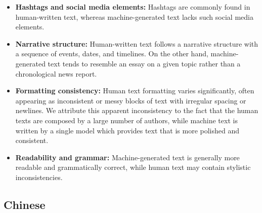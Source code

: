 \begin{itemize}
    \item \textbf{Hashtags and social media elements:} 
    Hashtags are commonly found in human-written text, whereas machine-generated text lacks such social media elements.

    \item \textbf{Narrative structure:} 
    Human-written text follows a narrative structure with a sequence of events, dates, and timelines. On the other hand, machine-generated text tends to resemble an essay on a given topic rather than a chronological news report.

    \item \textbf{Formatting consistency:} Human text formatting varies significantly, often appearing as inconsistent or messy blocks of text with irregular spacing or newlines. We attribute this apparent inconsistency to the fact that the human texts are composed by a large number of authors, while machine text is written by a single model which provides text that is more polished and consistent.

    \item \textbf{Readability and grammar:} 
    Machine-generated text is generally more readable and grammatically correct, while human text may contain stylistic inconsistencies.
\end{itemize}


\subsection{Chinese}
\label{sec:chinese-distinguishable-signal}
